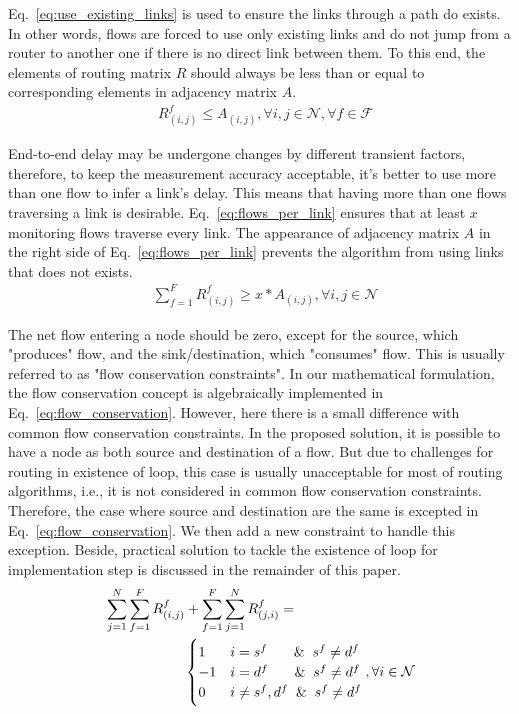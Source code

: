 \documentclass[10pt, journal, letterpaper]{IEEEtran}
\begin{document}
Eq.~\ref{eq:use_existing_links} is used to ensure the links through a path do exists. In other words, flows are forced to use only existing links and do not jump from a router to another one if there is no direct link between them. To this end, the elements of routing matrix $R$ should always be less than or equal to corresponding elements in adjacency matrix $A$.
\begin{align}
    & R_{(i,j)}^f \leq A_{(i,j)}, \forall i, j \in \mathcal{N}, \forall f \in \mathcal{F} \label{eq:use_existing_links}
\end{align}

End-to-end delay may be undergone changes by different transient factors, therefore, to keep the measurement accuracy acceptable, it's better to use more than one flow to infer a link's delay. This means that having more than one flows traversing a link is desirable. Eq.~\ref{eq:flows_per_link} ensures that at least $x$ monitoring flows traverse every link. The appearance of adjacency matrix $A$ in the right side of Eq.~\ref{eq:flows_per_link} prevents the algorithm from using links that does not exists.
\begin{align}
    & \sum_{f=1}^{F}{R_{(i,j)}^{f}}\geq x*A_{(i,j)},   \forall i,j \in \mathcal{N} \label{eq:flows_per_link}
\end{align}

The net flow entering a node should be zero, except for the source, which "produces" flow, and the sink/destination, which "consumes" flow. This is usually referred to as "flow conservation constraints". In our mathematical formulation, the flow conservation concept is algebraically implemented in  Eq.~\ref{eq:flow_conservation}. However, here there is a small difference with common flow conservation constraints. In the proposed solution, it is possible to have a node as both source and destination of a flow. But due to challenges for routing in existence of loop, this case is usually unacceptable for most of routing algorithms, i.e., it is not considered in common flow conservation constraints. Therefore, the case where source and destination are the same is excepted in Eq.~\ref{eq:flow_conservation}. We then add a new constraint to handle this exception. Beside, practical solution to tackle the existence of loop for implementation step is discussed in the remainder of this paper.
\begin{align} \label{eq:flow_conservation}
    & \sum_{j=1}^N{\sum_{f=1}^F{R_{(i,j)}^{f}}}+\sum_{f=1}^F{\sum_{j=1}^N{R_{(j,i)}^{f}}}=\\\nonumber
    &~~~~~~~~~~~~~~~~~ \begin{cases}
                     1 & i=s^f~~~~ \And s^f\neq d^f\\
                    -1 & i=d^f~~~~ \And s^f\neq d^f\\
                     0 & i\neq s^f,d^f \And s^f\neq d^f\\
                    \end{cases},  \forall i \in \mathcal{N}
\end{align}
\end{document}
